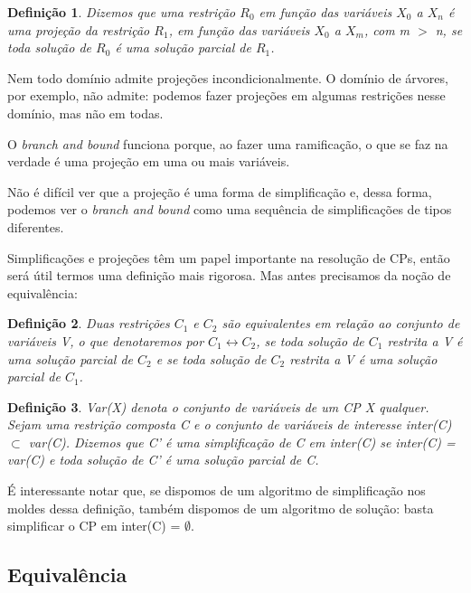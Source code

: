 \documentclass{article}
\newtheorem{definition}{Definição}[section]
\theoremstyle{remark}
\theoremstyle{theorem}
\begin{document}
\begin{definition}
  Dizemos que uma restrição $R_0$ em função das variáveis $X_0$ a $X_n$ é uma projeção da restrição $R_1$, em função das variáveis $X_0$ a $X_m$, com m $>$ n, se toda solução de $R_0$ é uma solução parcial de $R_1$.
\end{definition}

Nem todo domínio admite projeções incondicionalmente. O domínio de árvores, por exemplo, não admite: podemos fazer projeções em algumas restrições nesse domínio, mas não em todas.

O \textit{branch and bound} funciona porque, ao fazer uma ramificação, o que se faz na verdade é uma projeção em uma ou mais variáveis.

Não é difícil ver que a projeção é uma forma de simplificação e, dessa forma, podemos ver o \textit{branch and bound} como uma sequência de simplificações de tipos diferentes.

Simplificações e projeções têm um papel importante na resolução de CPs, então será útil termos uma definição mais rigorosa. Mas antes precisamos da noção de equivalência:

\begin{definition}
  Duas restrições $C_1$ e $C_2$ são equivalentes em relação ao conjunto de variáveis V, o que denotaremos por $C_1 \leftrightarrow C_2$, se toda solução de $C_1$ restrita a V é uma solução parcial de $C_2$ e se toda solução de $C_2$ restrita a V é uma solução parcial de $C_1$.
\end{definition}

\begin{definition}
  Var(X) denota o conjunto de variáveis de um CP X qualquer. Sejam uma restrição composta C e o conjunto de variáveis de interesse inter(C) $\subset$ var(C). Dizemos que C' é uma simplificação de C em inter(C) se inter(C) = var(C) e toda solução de C' é uma solução parcial de C.
\end{definition}

É interessante notar que, se dispomos de um algoritmo de simplificação nos moldes dessa definição, também dispomos de um algoritmo de solução: basta simplificar o CP em inter(C) = $\emptyset$.

\subsection{Equivalência}
\end{document}
